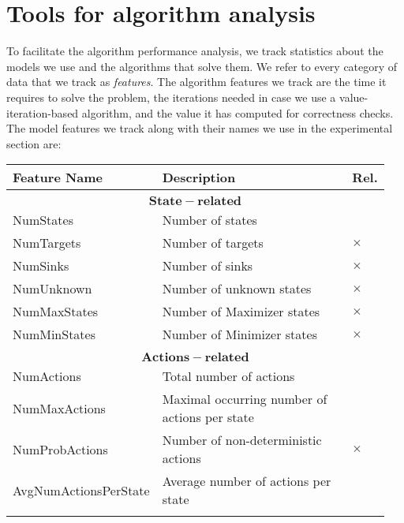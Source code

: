 \chapter{Tools for algorithm analysis} \label{ch:analysis}

To facilitate the algorithm performance analysis, we track statistics about the models we use and the algorithms that solve them. 
We refer to every category of data that we track as \emph{features}.
The algorithm features we track are the time it requires to solve the problem, the iterations needed in case we use a value-iteration-based algorithm, 
and the value it has computed for correctness checks.
The model features we track along with their names we use in the experimental section are:
    \begin{longtable}{| p{0.3\linewidth} | p{0.6\linewidth} | p{0.05\linewidth} |}
        \hline
        Feature Name & Description & Rel. \\\hline\multicolumn{3}{c}{}\\[-0.5em]\hline
        \endhead
        \multicolumn{3}{|c|}{$\mathbf{State-related}$} \\\hline
        NumStates & Number of states & \\\hline
        NumTargets & Number of targets & $\times$  \\\hline
        NumSinks & Number of sinks & $\times$ \\\hline
        NumUnknown & Number of unknown states & $\times$ \\\hline
        NumMaxStates & Number of Maximizer states & $\times$ \\\hline
        NumMinStates & Number of Minimizer states & $\times$ \\\hline\multicolumn{3}{c}{}\\[-0.5em]\hline

        \multicolumn{3}{|c|}{$\mathbf{Actions-related}$} \\\hline
        NumActions & Total number of actions & \\\hline
        NumMaxActions & Maximal occurring number of actions per state &  \\\hline
        NumProbActions & Number of non-deterministic actions & $\times$ \\\hline
        AvgNumActionsPerState & Average number of actions per state & \\\hline\multicolumn{3}{c}{}\\[-0.5em]\hline


\end{longtable}
